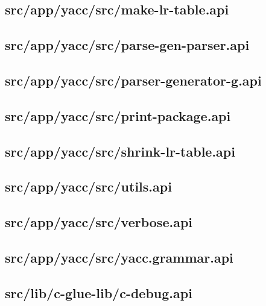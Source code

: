 \subsection{src/app/yacc/src/make-lr-table.api}


\subsection{src/app/yacc/src/parse-gen-parser.api}


\subsection{src/app/yacc/src/parser-generator-g.api}


\subsection{src/app/yacc/src/print-package.api}


\subsection{src/app/yacc/src/shrink-lr-table.api}


\subsection{src/app/yacc/src/utils.api}


\subsection{src/app/yacc/src/verbose.api}


\subsection{src/app/yacc/src/yacc.grammar.api}


\subsection{src/lib/c-glue-lib/c-debug.api}


